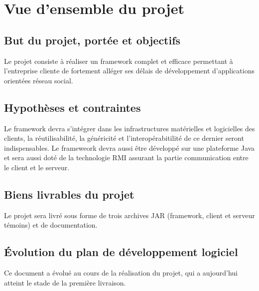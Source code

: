
\section{Vue d’ensemble du projet}
\subsection{But du projet, portée et objectifs}
Le projet consiste à réaliser un framework complet et efficace permettant à l'entreprise cliente de fortement alléger ses délais de développement d'applications orientées réseau social.

\subsection{Hypothèses et contraintes}
Le framework devra s'intégrer dans les infrastructures matérielles et logicielles des clients, la réutilisabilité, la généricité et l'interopérabitilité de ce dernier seront indispensables.
Le frameweork devra aussi être développé sur une plateforme Java et sera aussi doté de la technologie RMI assurant la partie communication entre le client et le serveur.

\subsection{Biens livrables du projet}
Le projet sera livré sous forme de trois archives JAR (framework, client et serveur témoins) et de documentation.

\subsection{Évolution du plan de développement logiciel}
Ce document a évolué au cours de la réalisation du projet, qui a aujourd'hui atteint le stade de la première livraison.